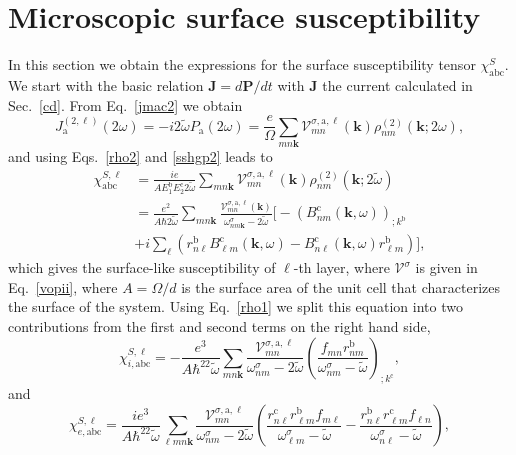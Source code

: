 \section{Microscopic surface susceptibility}
In this section we obtain the expressions for the 
surface susceptibility tensor $\chi^S_{\mathrm{abc}}$.
We start with the basic relation $\mathbf{J} = d\mathbf{P}/dt$ 
with $\mathbf{J}$ the current calculated in Sec.~\ref{cd}. From Eq.~\eqref{jmac2} 
we obtain
\begin{equation}\label{Pjikn}
J_{\mathrm{a}}^{(2,\ell)}(2\omega)=-i2\tilde{\omega} P_{\mathrm{a}}(2\omega)
=\frac{e}{\Omega}
\sum_{mn\mathbf{k}}
\mathcal{V}^{\sigma,\mathrm{a},\ell}_{mn}(\mathbf{k})
\rho^{(2)}_{nm}(\mathbf{k};2\omega)
,
\end{equation}
and using Eqs.~\eqref{rho2} and \eqref{sshgp2} leads to
\begin{align}\label{Pjikn2}
\chi^{S,\ell}_{\mathrm{abc}}
&=
\frac{ie}{A E^{\mathrm{b}}_1E^{\mathrm{c}}_2 2\tilde{\omega}}
\sum_{mn\mathbf{k}}
\mathcal{V}^{\sigma,\mathrm{a},\ell}_{mn}(\mathbf{k})
\rho^{(2)}_{nm}(\mathbf{k};2\tilde{\omega})
\nonumber \\
&=
\frac{e^2}{A\hbar2\tilde{\omega}}
\sum_{mn\mathbf{k}}
\frac{\mathcal{V}^{\sigma,\mathrm{a},\ell}_{mn}(\mathbf{k})}
{\omega^\sigma_{nm\mathbf{k}}-2\tilde{\omega}}
\bigg[
-(B_{nm}^{\mathrm{c}}(\mathbf{k},\omega))_{;k^{\mathrm{b}}}
\nonumber \\
&
+i\sum_\ell\left(r_{n\ell}^{\mathrm{b}}B_{\ell m}^{\mathrm{c}}(\mathbf{k},\omega) -
  B_{n\ell}^{\mathrm{c}}(\mathbf{k},\omega) 
  r_{\ell m}^{\mathrm{b}}\right)
\bigg]
,
\end{align}
which gives the surface-like susceptibility of $\ell$-th layer, where 
$\boldsymbol{\mathcal{V}}^\sigma$ is given in Eq.~\eqref{vopii},
where $A=\Omega/d$ is the surface area of the unit
cell that characterizes the surface of the system.
Using Eq.~\eqref{rho1} we
split this equation into
two contributions from the first and second terms on the right hand side,
\begin{equation}\label{chii}
\chi_{i,\mathrm{abc}}^{S,\ell}
=-\frac{e^3}{A\hbar^22\tilde{\omega}}\sum_{mn\mathbf{k}}
\frac{\mathcal{V}_{mn}^{\sigma,\mathrm{a},\ell}}{\omega^\sigma_{nm}-2\tilde{\omega}}
\left(\frac{f_{mn}r_{nm}^{\mathrm{b}}}{\omega^\sigma_{nm}-\tilde{\omega}}\right)_{;k^{\mathrm{c}}},
\end{equation} 
and 
\begin{equation}\label{chie}
\chi_{e,\mathrm{abc}}^{S,\ell}
=\frac{ie^3}{A\hbar^22\tilde{\omega}}\sum_{\ell mn\mathbf{k}}
\frac{\mathcal{V}_{mn}^{\sigma,\mathrm{a},\ell}}{\omega^\sigma_{nm}-2\tilde{\omega}}
\left(
\frac{r_{n\ell}^{\mathrm{c}} r_{\ell m}^{\mathrm{b}} 
f_{m\ell}}{\omega^\sigma_{\ell m}-\tilde{\omega}}
-\frac{r_{n\ell}^{\mathrm{b}} r_{\ell m}^{\mathrm{c}} 
f_{\ell n}}{\omega^\sigma_{n \ell}-\tilde{\omega}}
\right),
\end{equation} 
